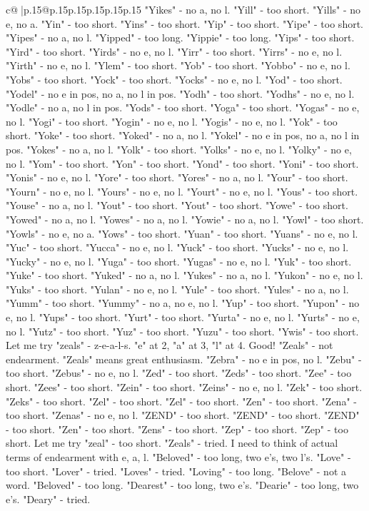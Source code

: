 \documentclass{article}
\begin{document}
{\begin{supertabular}{c@{$\;$}|p{.15\linewidth}@{}p{.15\linewidth}p{.15\linewidth}p{.15\linewidth}p{.15\linewidth}p{.15\linewidth}}
{{{"Yikes" {-} no a, no l. "Yill" {-} too short. "Yills" {-} no e, no a. "Yin" {-} too short. "Yins" {-} too short. "Yip" {-} too short. "Yipe" {-} too short. "Yipes" {-} no a, no l. "Yipped" {-} too long. "Yippie" {-} too long. "Yips" {-} too short. "Yird" {-} too short. "Yirds" {-} no e, no l. "Yirr" {-} too short. "Yirrs" {-} no e, no l. "Yirth" {-} no e, no l. "Ylem" {-} too short. "Yob" {-} too short. "Yobbo" {-} no e, no l. "Yobs" {-} too short. "Yock" {-} too short. "Yocks" {-} no e, no l. "Yod" {-} too short. "Yodel" {-} no e in pos, no a, no l in pos. "Yodh" {-} too short. "Yodhs" {-} no e, no l. "Yodle" {-} no a, no l in pos. "Yods" {-} too short. "Yoga" {-} too short. "Yogas" {-} no e, no l. "Yogi" {-} too short. "Yogin" {-} no e, no l. "Yogis" {-} no e, no l. "Yok" {-} too short. "Yoke" {-} too short. "Yoked" {-} no a, no l. "Yokel" {-} no e in pos, no a, no l in pos. "Yokes" {-} no a, no l. "Yolk" {-} too short. "Yolks" {-} no e, no l. "Yolky" {-} no e, no l. "Yom" {-} too short. "Yon" {-} too short. "Yond" {-} too short. "Yoni" {-} too short. "Yonis" {-} no e, no l. "Yore" {-} too short. "Yores" {-} no a, no l. "Your" {-} too short. "Yourn" {-} no e, no l. "Yours" {-} no e, no l. "Yourt" {-} no e, no l. "Yous" {-} too short. "Youse" {-} no a, no l. "Yout" {-} too short. "Yout" {-} too short. "Yowe" {-} too short. "Yowed" {-} no a, no l. "Yowes" {-} no a, no l. "Yowie" {-} no a, no l. "Yowl" {-} too short. "Yowls" {-} no e, no a. "Yows" {-} too short. "Yuan" {-} too short. "Yuans" {-} no e, no l. "Yuc" {-} too short. "Yucca" {-} no e, no l. "Yuck" {-} too short. "Yucks" {-} no e, no l. "Yucky" {-} no e, no l. "Yuga" {-} too short. "Yugas" {-} no e, no l. "Yuk" {-} too short. "Yuke" {-} too short. "Yuked" {-} no a, no l. "Yukes" {-} no a, no l. "Yukon" {-} no e, no l. "Yuks" {-} too short. "Yulan" {-} no e, no l. "Yule" {-} too short. "Yules" {-} no a, no l. "Yumm" {-} too short. "Yummy" {-} no a, no e, no l. "Yup" {-} too short. "Yupon" {-} no e, no l. "Yups" {-} too short. "Yurt" {-} too short. "Yurta" {-} no e, no l. "Yurts" {-} no e, no l. "Yutz" {-} too short. "Yuz" {-} too short. "Yuzu" {-} too short. "Ywis" {-} too short. Let me try "zeals" {-} z{-}e{-}a{-}l{-}s. "e" at 2, "a" at 3, "l" at 4. Good! "Zeals" {-} not endearment. "Zeals" means great enthusiasm. "Zebra" {-} no e in pos, no l. "Zebu" {-} too short. "Zebus" {-} no e, no l. "Zed" {-} too short. "Zeds" {-} too short. "Zee" {-} too short. "Zees" {-} too short. "Zein" {-} too short. "Zeins" {-} no e, no l. "Zek" {-} too short. "Zeks" {-} too short. "Zel" {-} too short. "Zel" {-} too short. "Zen" {-} too short. "Zena" {-} too short. "Zenas" {-} no e, no l. "ZEND" {-} too short. "ZEND" {-} too short. "ZEND" {-} too short. "Zen" {-} too short. "Zens" {-} too short. "Zep" {-} too short. "Zep" {-} too short. Let me try "zeal" {-} too short. "Zeals" {-} tried. I need to think of actual terms of endearment with e, a, l. "Beloved" {-} too long, two e's, two l's. "Love" {-} too short. "Lover" {-} tried. "Loves" {-} tried. "Loving" {-} too long. "Belove" {-} not a word. "Beloved" {-} too long. "Dearest" {-} too long, two e's. "Dearie" {-} too long, two e's. "Deary" {-} tried. }}}
\end{supertabular}}
\end{document}
